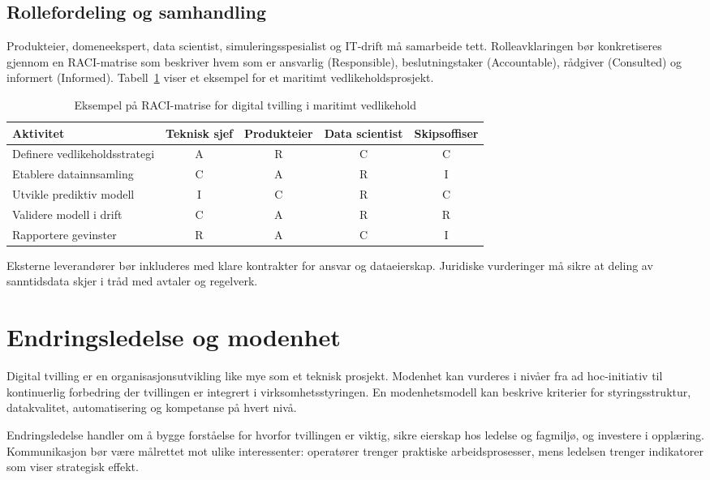 \subsection*{Rollefordeling og samhandling}
Produkteier, domeneekspert, data scientist, simuleringsspesialist og IT-drift må samarbeide tett. Rolleavklaringen bør konkretiseres gjennom en RACI-matrise som beskriver hvem som er ansvarlig (Responsible), beslutningstaker (Accountable), rådgiver (Consulted) og informert (Informed). Tabell~\ref{tab:raci-maritim} viser et eksempel for et maritimt vedlikeholdsprosjekt.

\begin{table}[h]
    \centering
    \caption{Eksempel på RACI-matrise for digital tvilling i maritimt vedlikehold}
    \label{tab:raci-maritim}
    \begin{tabular}{p{4cm}cccc}
        \toprule
        Aktivitet & Teknisk sjef & Produkteier & Data scientist & Skipsoffiser \\
        \midrule
        Definere vedlikeholdsstrategi & A & R & C & C \\
        Etablere datainnsamling & C & A & R & I \\
        Utvikle prediktiv modell & I & C & R & C \\
        Validere modell i drift & C & A & R & R \\
        Rapportere gevinster & R & A & C & I \\
        \bottomrule
    \end{tabular}
\end{table}

Eksterne leverandører bør inkluderes med klare kontrakter for ansvar og dataeierskap. Juridiske vurderinger må sikre at deling av sanntidsdata skjer i tråd med avtaler og regelverk.

\section{Endringsledelse og modenhet}
Digital tvilling er en organisasjonsutvikling like mye som et teknisk prosjekt. Modenhet kan vurderes i nivåer fra ad hoc-initiativ til kontinuerlig forbedring der tvillingen er integrert i virksomhetsstyringen. En modenhetsmodell kan beskrive kriterier for styringsstruktur, datakvalitet, automatisering og kompetanse på hvert nivå.

Endringsledelse handler om å bygge forståelse for hvorfor tvillingen er viktig, sikre eierskap hos ledelse og fagmiljø, og investere i opplæring. Kommunikasjon bør være målrettet mot ulike interessenter: operatører trenger praktiske arbeidsprosesser, mens ledelsen trenger indikatorer som viser strategisk effekt.

